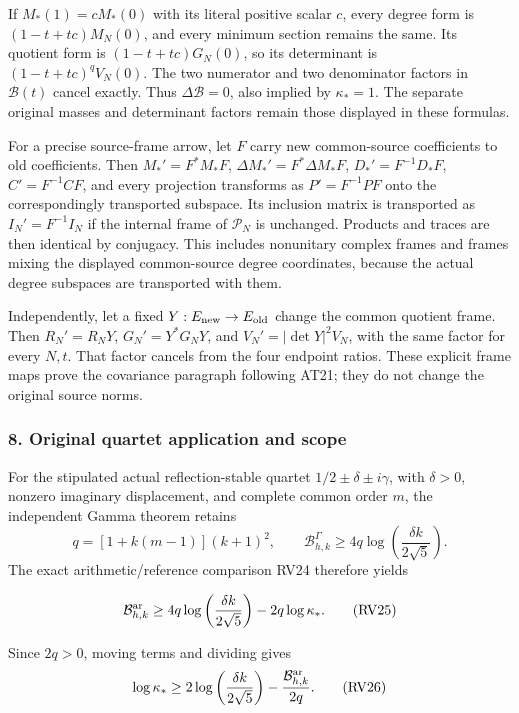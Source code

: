 If \(M_*(1)=cM_*(0)\) with its literal positive scalar \(c\), every degree form is \((1-t+tc)M_N(0)\), and every minimum section remains the same. Its quotient form is \((1-t+tc)G_N(0)\), so its determinant is \((1-t+tc)^qV_N(0)\). The two numerator and two denominator factors in \(\mathcal B(t)\) cancel exactly. Thus \(\Delta\mathcal B=0\), also implied by \(\kappa_*=1\). The separate original masses and determinant factors remain those displayed in these formulas.

For a precise source-frame arrow, let \(F\) carry new common-source coefficients to old coefficients. Then \(M_*'=F^*M_*F\), \(\Delta M_*'=F^*\Delta M_*F\), \(D_*'=F^{-1}D_*F\), \(C'=F^{-1}CF\), and every projection transforms as \(P'=F^{-1}PF\) onto the correspondingly transported subspace. Its inclusion matrix is transported as \(I_N'=F^{-1}I_N\) if the internal frame of \(\mathcal P_N\) is unchanged. Products and traces are then identical by conjugacy. This includes nonunitary complex frames and frames mixing the displayed common-source degree coordinates, because the actual degree subspaces are transported with them.

Independently, let a fixed \(Y:E_{\rm new}\to E_{\rm old}\) change the common quotient frame. Then \(R_N'=R_NY\), \(G_N'=Y^*G_NY\), and \(V_N'=|\det Y|^2V_N\), with the same factor for every \(N,t\). That factor cancels from the four endpoint ratios. These explicit frame maps prove the covariance paragraph following AT21; they do not change the original source norms.

\subsubsection{8. Original quartet application and scope}\label{endpoint-determinant_review--original-quartet-application-and-scope}

For the stipulated actual reflection-stable quartet \(1/2\pm\delta\pm i\gamma\), with \(\delta>0\), nonzero imaginary displacement, and complete common order \(m\), the independent Gamma theorem retains \[
q=[1+k(m-1)](k+1)^2,\qquad
\mathcal B^\Gamma_{h,k}\ge4q\log\left(\frac{\delta k}{2\sqrt5}\right).
\] The exact arithmetic/reference comparison RV24 therefore yields

\[
\mathcal B^{\rm ar}_{h,k}\ge
4q\log\left(\frac{\delta k}{2\sqrt5}\right)-2q\log\kappa_*.
\tag{RV25}
\]

Since \(2q>0\), moving terms and dividing gives \[
\log\kappa_*\ge
2\log\left(\frac{\delta k}{2\sqrt5}\right)
-\frac{\mathcal B^{\rm ar}_{h,k}}{2q}.
\tag{RV26}
\]

